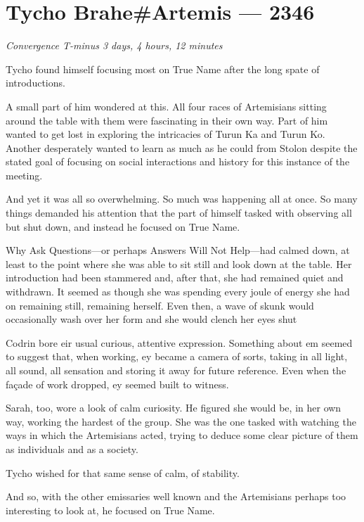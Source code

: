 \hypertarget{tycho-braheartemis-2346}{%
\chapter{Tycho Brahe\#Artemis — 2346}}

\begin{center}
\emph{Convergence T-minus 3 days, 4 hours, 12 minutes}
\end{center}

\noindent Tycho found himself focusing most on True Name after the long spate of introductions.

A small part of him wondered at this. All four races of Artemisians sitting around the table with them were fascinating in their own way. Part of him wanted to get lost in exploring the intricacies of Turun Ka and Turun Ko. Another desperately wanted to learn as much as he could from Stolon despite the stated goal of focusing on social interactions and history for this instance of the meeting.

And yet it was all so overwhelming. So much was happening all at once. So many things demanded his attention that the part of himself tasked with observing all but shut down, and instead he focused on True Name.

Why Ask Questions—or perhaps Answers Will Not Help—had calmed down, at least to the point where she was able to sit still and look down at the table. Her introduction had been stammered and, after that, she had remained quiet and withdrawn. It seemed as though she was spending every joule of energy she had on remaining still, remaining herself. Even then, a wave of skunk would occasionally wash over her form and she would clench her eyes shut

Codrin bore eir usual curious, attentive expression. Something about em seemed to suggest that, when working, ey became a camera of sorts, taking in all light, all sound, all sensation and storing it away for future reference. Even when the façade of work dropped, ey seemed built to witness.

Sarah, too, wore a look of calm curiosity. He figured she would be, in her own way, working the hardest of the group. She was the one tasked with watching the ways in which the Artemisians acted, trying to deduce some clear picture of them as individuals and as a society.

Tycho wished for that same sense of calm, of stability.

And so, with the other emissaries well known and the Artemisians perhaps too interesting to look at, he focused on True Name.

